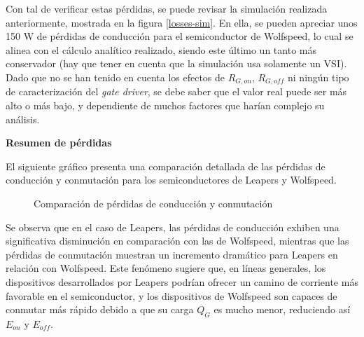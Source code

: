 Con tal de verificar estas pérdidas, se puede revisar la simulación realizada anteriormente, mostrada en la figura \ref{losses-sim}. En ella, se pueden apreciar unos 150 W de pérdidas de conducción para el semiconductor de Wolfspeed, lo cual se alinea con el cálculo analítico realizado, siendo este último un tanto más conservador (hay que tener en cuenta que la simulación usa solamente un VSI). Dado que no se han tenido en cuenta los efectos de $R_{G, on}$, $R_{G, off}$ ni ningún tipo de caracterización del \textit{gate driver}, se debe saber que el valor real puede ser más alto o más bajo, y dependiente de muchos factores que harían complejo su análisis.


\textbf{Resumen de pérdidas}

El siguiente gráfico presenta una comparación detallada de las pérdidas de conducción y conmutación para los semiconductores de Leapers y Wolfspeed.

\begin{figure}[H]
	\centering
	\caption{Comparación de pérdidas de conducción y conmutación}
	\label{fig:loss_comparison}
\end{figure}

Se observa que en el caso de Leapers, las pérdidas de conducción exhiben una significativa disminución en comparación con las de Wolfspeed, mientras que las pérdidas de conmutación muestran un incremento dramático para Leapers en relación con Wolfspeed. Este fenómeno sugiere que, en líneas generales, los dispositivos desarrollados por Leapers podrían ofrecer un camino de corriente más favorable en el semiconductor, y los dispositivos de Wolfspeed son capaces de conmutar más rápido debido a que su carga $Q_G$ es mucho menor, reduciendo así $E_{on}$ y $E_{off}$.

